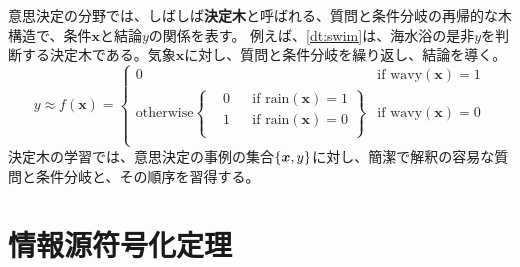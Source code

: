 \documentclass[10pt,a4paper]{book}
\begin{document}
意思決定の分野では、しばしば\textbf{決定木}と呼ばれる、質問と条件分岐の再帰的な木構造で、条件$\bm{x}$と結論$y$の関係を表す。
例えば、\eqref{dt:swim}は、海水浴の是非$y$を判断する決定木である。気象$\bm{x}$に対し、質問と条件分岐を繰り返し、結論を導く。
%
\begin{equation}
\label{eq:dt:swim}
y \approx f(\bm{x}) =
\begin{cases}
0 & \text{if $\mathrm{wavy}(\bm{x}) = 1$} \\
\text{otherwise}
\left\{
\begin{aligned}
& 0 && \text{if $\mathrm{rain}(\bm{x}) = 1$} \\
& 1 && \text{if $\mathrm{rain}(\bm{x}) = 0$} \\
\end{aligned}
\right\}
& \text{if $\mathrm{wavy}(\bm{x}) = 0$} \\
\end{cases}
\end{equation}
%
決定木の学習では、意思決定の事例の集合$\seqXy$に対し、簡潔で解釈の容易な質問と条件分岐と、その順序を習得する。

\section{情報源符号化定理\label{sect:info}}
\end{document}
